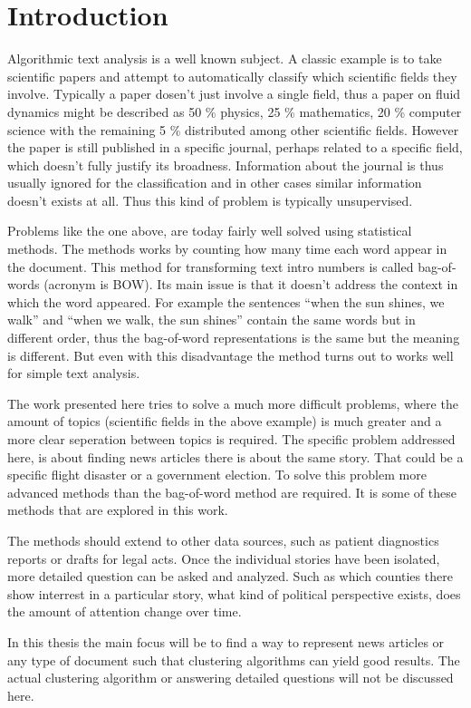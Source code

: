 \chapter{Introduction}

Algorithmic text analysis is a well known subject.
A classic example is to take scientific papers and attempt to automatically classify which scientific fields they involve.
Typically a paper dosen't just involve a single field, thus a paper on fluid dynamics might be described as 50 \% physics, 25 \% mathematics, 20 \% computer science with the remaining 5 \% distributed among other scientific fields.
However the paper is still published in a specific journal, perhaps related to a specific field, which doesn't fully justify its broadness.
Information about the journal is thus usually ignored for the classification and in other cases similar information doesn't exists at all. Thus this kind of problem is typically unsupervised.

Problems like the one above, are today fairly well solved\cite{missing source} using statistical methods.
The methods works by counting how many time each word appear in the document.
This method for transforming text intro numbers is called bag-of-words (acronym is BOW).
Its main issue is that it doesn't address the context in which the word appeared.
For example the sentences ``when the sun shines, we walk'' and ``when we walk, the sun shines'' contain the same words but in different order, thus the bag-of-word representations is the same but the meaning is different.
But even with this disadvantage the method turns out to works well for simple text analysis.

The work presented here tries to solve a much more difficult problems, where the amount of topics (scientific fields in the above example) is much greater and a more clear seperation between topics is required.
The specific problem addressed here, is about finding news articles there is about the same story.
That could be a specific flight disaster or a government election.
To solve this problem more advanced methods than the bag-of-word method are required.
It is some of these methods that are explored in this work.

The methods should extend to other data sources, such as patient diagnostics reports or drafts for legal acts.
Once the individual stories have been isolated, more detailed question can be asked and analyzed. Such as which counties there show interrest in a particular story, what kind of political perspective exists, does the amount of attention change over time.

In this thesis the main focus will be to find a way to represent news articles or any type of document such that clustering algorithms can yield good results. The actual clustering algorithm or answering detailed questions will not be discussed here.
